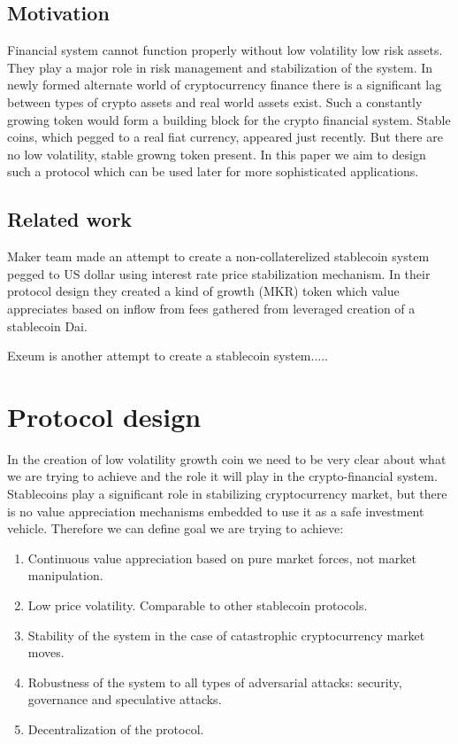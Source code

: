 \documentclass[12pt, a4paper, twocolumn]{article}
\begin{document}
\subsection{Motivation}
Financial system cannot function properly without low volatility low risk assets. They play a major role in risk management and stabilization of the system. In newly formed alternate world of cryptocurrency finance there is a significant lag between types of crypto assets and real world assets exist. Such a constantly growing token would form a building block for the crypto financial system. Stable coins, which pegged to a real fiat currency, appeared just recently. But there are no low volatility, stable growng token present. In this paper we aim to design such a protocol which can be used later for more sophisticated applications.

\subsection{Related work}

Maker team \cite{dai} made an attempt to create a non-collaterelized stablecoin system pegged to US dollar using interest rate price stabilization mechanism. In their protocol design they created a kind of growth (MKR) token which value appreciates based on inflow from fees gathered from leveraged creation of a stablecoin Dai.

Exeum is another attempt to create a stablecoin system..... \cite{1808.03482}
 
 \section{Protocol design}
In the creation of low volatility growth coin we need to be very clear about what we are trying to achieve and the role it will play in the crypto-financial system. Stablecoins play a significant role in stabilizing cryptocurrency market, but there is no value appreciation mechanisms embedded to use it as a safe investment vehicle. Therefore we can define goal we are trying to achieve:
\begin{enumerate}
\item Continuous value appreciation based on pure market forces, not market manipulation.
\item Low price volatility. Comparable to other stablecoin protocols.
\item Stability of the system in the case of catastrophic cryptocurrency market moves.
\item Robustness of the system to all types of adversarial attacks: security, governance  and speculative attacks.
\item Decentralization of the protocol.
\end{enumerate}
 
\end{document}
